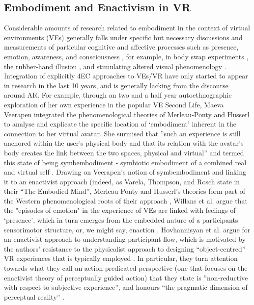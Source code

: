 \subsection{Embodiment and Enactivism in VR}
Considerable amounts of research related to embodiment in the context of virtual environments (VEs) generally falls under specific but necessary discussions and measurements of particular cognitive and affective processes such as presence, emotion, awareness, and consciousness \citep[]{slater1994,seth2012}, for example, in body swap experiments \citep[]{slater2010}, the rubber-hand illusion \citep[]{suzuki2013}, and stimulating altered visual phenomenology \citep[]{suzuki2017}. Integration of explicitly 4EC approaches to VEs/VR have only started to appear in research in the last 10 years, and is generally lacking from the discourse around AR. For example, through an two and a half year autoethnographic exploration of her own experience in the popular VE Second Life, Maeva Veerapen integrated the phenomenological theories of Merleau-Ponty and Husserl to analyse and explicate the specific location of ‘embodiment’ inherent in the connection to her virtual avatar. She surmised that ”such an experience is still anchored within the user's physical body and that its relation with the avatar's body creates the link between the two spaces, physical and virtual” and termed this state of being symbembodiment - symbiotic embodiment of a combined real and virtual self \citep[]{veerapen2011}. Drawing on Veerapen’s notion of symbembodiment and linking it to an enactivist approach (indeed, as Varela, Thompson, and Rosch state in their “The Embodied Mind”, Merleau-Ponty and Husserl’s theories form part of the Western phenomenological roots of their approach \citeyearpar[pp. 173, 18]{varela1993}, Willans et al. argue that the "episodes of emotion" in the experience of VEs are linked with feelings of ‘presence’, which in turn emerges from the embedded nature of a participants sensorimotor structure, or, we might say, enaction \citeyearpar[p. 23]{willans2016}. Hovhannisyan et al. argue for an enactivist approach to understanding participant flow, which is motivated by the authors’ resistance to the physicalist approach to designing “object-centred”  VR experiences that is typically employed \citeyearpar[p. 1]{hovhannisyan2019}. In particular, they turn attention towards what they call an action-predicated perspective (one that focuses on the enactivist theory of perceptually guided action) that they state is ”non-reductive with respect to subjective experience”, and honours “the pragmatic dimension of perceptual reality” \citeyearpar[p. 18]{hovhannisyan2019}. 
